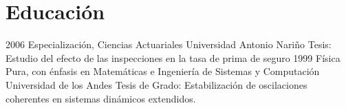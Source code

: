 \section{Educación}
\begin{entrylist}
  \entry
     {2006}
	{Especialización, Ciencias Actuariales}
	{Universidad Antonio Nariño}
	{Tesis: Estudio del efecto de las inspecciones en la tasa de prima de seguro}
  \entry
	{1999}
	{Física Pura, con énfasis en Matemáticas e Ingeniería de Sistemas y Computación}
	{Universidad de los Andes}
	{Tesis de Grado: Estabilización de oscilaciones coherentes en sistemas dinámicos extendidos.}
\end{entrylist}
